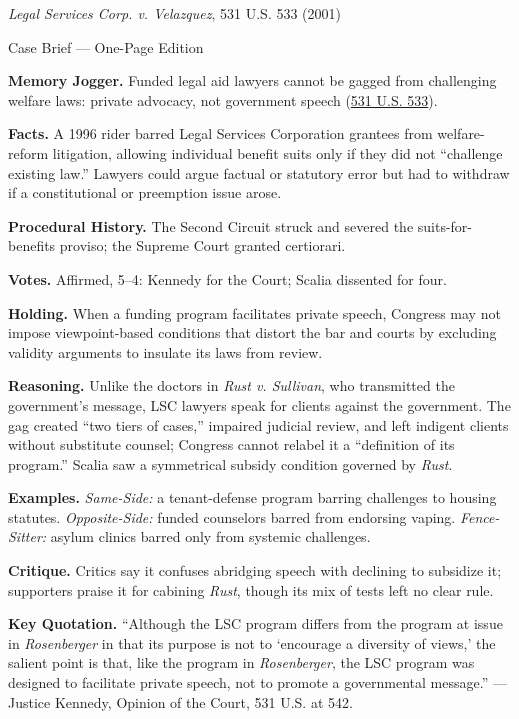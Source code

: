 \documentclass[12pt]{article}
\begin{document}
\begin{center}
{\Large \textit{Legal Services Corp. v. Velazquez}, 531 U.S. 533 (2001)\par}
\vspace{0.3em}
{\normalsize Case Brief --- One-Page Edition\par}
\end{center}

\textbf{Memory Jogger.} Funded legal aid lawyers cannot be gagged from challenging welfare laws: private advocacy, not government speech (\href{https://supreme.justia.com/cases/federal/us/531/533/}{531 U.S. 533}).

\textbf{Facts.} A 1996 rider barred Legal Services Corporation grantees from welfare-reform litigation, allowing individual benefit suits only if they did not ``challenge existing law.'' Lawyers could argue factual or statutory error but had to withdraw if a constitutional or preemption issue arose.

\textbf{Procedural History.} The Second Circuit struck and severed the suits-for-benefits proviso; the Supreme Court granted certiorari.

\textbf{Votes.} Affirmed, 5--4: Kennedy for the Court; Scalia dissented for four.

\textbf{Holding.} When a funding program facilitates private speech, Congress may not impose viewpoint-based conditions that distort the bar and courts by excluding validity arguments to insulate its laws from review.

\textbf{Reasoning.} Unlike the doctors in \textit{Rust v. Sullivan}, who transmitted the government's message, LSC lawyers speak for clients against the government. The gag created ``two tiers of cases,'' impaired judicial review, and left indigent clients without substitute counsel; Congress cannot relabel it a ``definition of its program.'' Scalia saw a symmetrical subsidy condition governed by \textit{Rust}.

\textbf{Examples.} \emph{Same-Side:} a tenant-defense program barring challenges to housing statutes. \emph{Opposite-Side:} funded counselors barred from endorsing vaping. \emph{Fence-Sitter:} asylum clinics barred only from systemic challenges.

\textbf{Critique.} Critics say it confuses abridging speech with declining to subsidize it; supporters praise it for cabining \textit{Rust}, though its mix of tests left no clear rule.

\textbf{Key Quotation.} ``Although the LSC program differs from the program at issue in \textit{Rosenberger} in that its purpose is not to `encourage a diversity of views,' the salient point is that, like the program in \textit{Rosenberger}, the LSC program was designed to facilitate private speech, not to promote a governmental message.'' --- Justice Kennedy, Opinion of the Court, 531 U.S. at 542.
\end{document}
